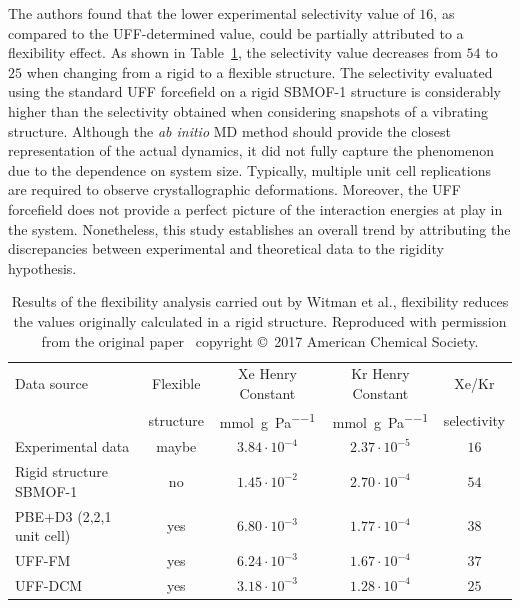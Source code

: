 \documentclass[main]{subfiles}
\begin{document}
The authors found that the lower experimental selectivity value of $16$, as compared to the UFF-determined value, could be partially attributed to a flexibility effect. As shown in Table~\ref{table:witman_sbmof}, the selectivity value decreases from $54$ to $25$ when changing from a rigid to a flexible structure. The selectivity evaluated using the standard UFF forcefield on a rigid SBMOF-1 structure is considerably higher than the selectivity obtained when considering snapshots of a vibrating structure. Although the \emph{ab initio} MD method should provide the closest representation of the actual dynamics, it did not fully capture the phenomenon due to the dependence on system size. Typically, multiple unit cell replications are required to observe crystallographic deformations. Moreover, the UFF forcefield does not provide a perfect picture of the interaction energies at play in the system. Nonetheless, this study establishes an overall trend by attributing the discrepancies between experimental and theoretical data to the rigidity hypothesis.

\begin{table}[t]
  \centering
  \small
  \begin{tabular}{|l|c|c|c|c|}
  \hline
    Data source & Flexible &  Xe Henry Constant &  Kr Henry Constant &  Xe/Kr \\
      & structure &  \si{\mmol\per\g\per\Pa} &  \si{\mmol\per\g\per\Pa} &  selectivity \\
  \hline
    Experimental data\autocite{Banerjee_2016} & maybe &  $3.84\cdot10^{-4}$ &  $2.37\cdot10^{-5}$ &  $16$ \\
  \hline
    Rigid structure SBMOF-1\autocite{Banerjee_2016} & no &  $1.45\cdot10^{-2}$ &  $2.70\cdot10^{-4}$ &  $54$ \\
    PBE+D3 (2,2,1 unit cell) & yes &  $6.80\cdot10^{-3}$ &  $1.77\cdot10^{-4}$ &  $38$ \\
    UFF-FM & yes &  $6.24\cdot10^{-3}$ &  $1.67\cdot10^{-4}$ &  $37$ \\
    UFF-DCM & yes &  $3.18\cdot10^{-3}$ &  $1.28\cdot10^{-4}$ &  $25$ \\
  \hline
\end{tabular}
\caption{ Results of the flexibility analysis carried out by Witman et al., flexibility reduces the values originally calculated in a rigid structure. Reproduced with permission from the original paper~\cite{Witman_2017} copyright \copyright\ 2017 American Chemical Society.}\label{table:witman_sbmof}
\end{table}
\end{document}
